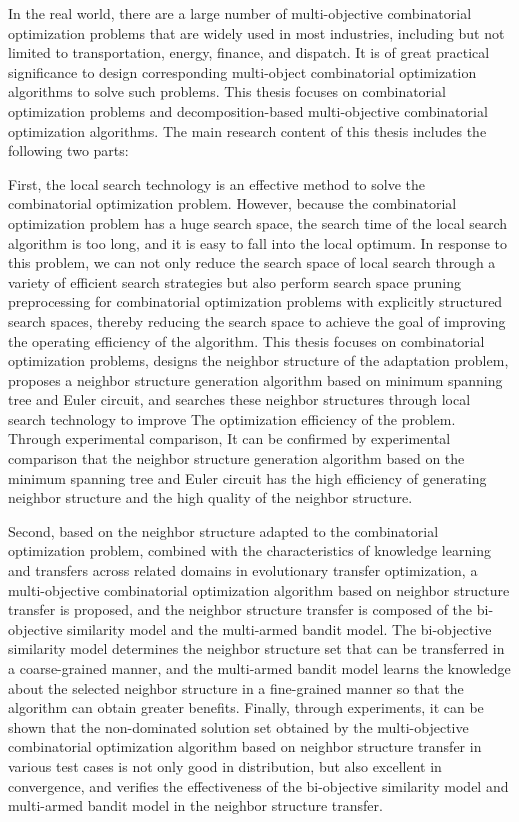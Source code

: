 \begin{abstractEn}
\label{abstractEn}
    In the real world, there are a large number of multi-objective combinatorial optimization problems that are widely used in most industries, including but not limited to transportation, energy, finance, and dispatch. It is of great practical significance to design corresponding multi-object combinatorial optimization algorithms to solve such problems. This thesis focuses on combinatorial optimization problems and decomposition-based multi-objective combinatorial optimization algorithms. The main research content of this thesis includes the following two parts:
    \par
    First, the local search technology is an effective method to solve the combinatorial optimization problem. However, because the combinatorial optimization problem has a huge search space, the search time of the local search algorithm is too long, and it is easy to fall into the local optimum. In response to this problem, we can not only reduce the search space of local search through a variety of efficient search strategies but also perform search space pruning preprocessing for combinatorial optimization problems with explicitly structured search spaces, thereby reducing the search space to achieve the goal of improving the operating efficiency of the algorithm. This thesis focuses on combinatorial optimization problems, designs the neighbor structure of the adaptation problem, proposes a neighbor structure generation algorithm based on minimum spanning tree and Euler circuit, and searches these neighbor structures through local search technology to improve The optimization efficiency of the problem. Through experimental comparison, It can be confirmed by experimental comparison that the neighbor structure generation algorithm based on the minimum spanning tree and Euler circuit has the high efficiency of generating neighbor structure and the high quality of the neighbor structure.
    \par
    Second, based on the neighbor structure adapted to the combinatorial optimization problem, combined with the characteristics of knowledge learning and transfers across related domains in evolutionary transfer optimization, a multi-objective combinatorial optimization algorithm based on neighbor structure transfer is proposed, and the neighbor structure transfer is composed of the bi-objective similarity model and the multi-armed bandit model. The bi-objective similarity model determines the neighbor structure set that can be transferred in a coarse-grained manner, and the multi-armed bandit model learns the knowledge about the selected neighbor structure in a fine-grained manner so that the algorithm can obtain greater benefits. Finally, through experiments, it can be shown that the non-dominated solution set obtained by the multi-objective combinatorial optimization algorithm based on neighbor structure transfer in various test cases is not only good in distribution, but also excellent in convergence, and verifies the effectiveness of the bi-objective similarity model and multi-armed bandit model in the neighbor structure transfer.
\end{abstractEn}
